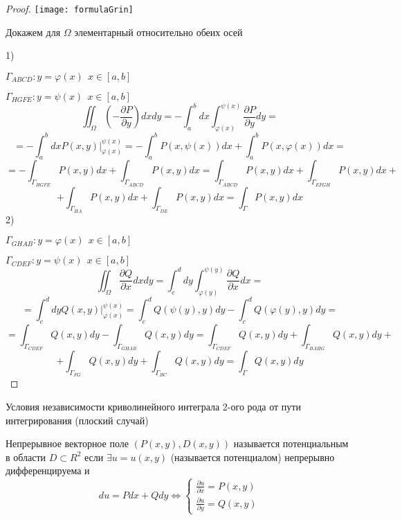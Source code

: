 \begin{proof}
  \texttt{[image: formulaGrin]}

  Докажем для $\Omega$ элементарный относительно обеих осей

  1)

  $\Gamma_{ABCD}: y = \varphi(x) ~~ x \in [a,b]$

  $\Gamma_{HGFE}: y = \psi(x) ~~ x \in [a,b]$
  $$
  \iint_{\Omega} \left( -\frac{\partial P}{\partial y} \right) dx dy =
  -\int_a^b dx \int_{\varphi(x)}^{\psi(x)} \frac{\partial P}{\partial y} dy =
  $$
  $$
  = -\int_a^b dx P(x,y) |_{\varphi(x)}^{\psi(x)} =
  - \int_a^b P(x, \psi(x))dx + \int_a^b P(x, \varphi(x)) dx =
  $$
  $$
  = -\int_{\Gamma_{HGFE}} P(x, y) dx + \int_{\Gamma_{ABCD}} P(x,y)dx =
  \int_{\Gamma_{ABCD}} P(x,y)dx + \int_{\Gamma_{EFGH}} P(x,y)dx +
  $$
  $$
  + \int_{\Gamma_{HA}} P(x, y)dx + \int_{\Gamma_{DE}} P(x,y) dx =
  \int_{\Gamma} P(x,y) dx
  $$
  2)

  $\Gamma_{GHAB}: y = \varphi(x) ~~ x \in [a,b]$

  $\Gamma_{CDEF}: y = \psi(x) ~~ x \in [a,b]$
  $$
  \iint_{\Omega} \frac{\partial Q}{\partial x} dx dy =
  \int_c^d dy \int_{\varphi(y)}^{\psi(y)} \frac{\partial Q}{\partial x} dx =
  $$
  $$
  = \int_c^d dy Q(x,y) |_{\varphi(x)}^{\psi(x)} =
  \int_c^d Q(\psi(y), y)dy - \int_c^d Q(\varphi(y), y) dy =
  $$
  $$
  = \int_{\Gamma_{CDEF}} Q(x, y) dy - \int_{\Gamma_{GHAB}} Q(x,y)dy =
  \int_{\Gamma_{CDEF}} Q(x, y) dy + \int_{\Gamma_{BAHG}} Q(x,y)dy +
  $$
  $$
  + \int_{\Gamma_{FG}} Q(x, y)dy + \int_{\Gamma_{BC}} Q(x,y) dy =
  \int_{\Gamma} Q(x,y) dy
  $$
\end{proof}

\begin{title}[\Large]
  Условия независимости криволинейного интеграла 2-ого рода от пути
  интегрирования (плоский случай)
\end{title}

\begin{define}
  Непрерывное векторное поле $(P(x,y), D(x,y))$ называется потенциальным в
  области $D \subset R^2$ если $\exists u = u(x,y)$ (называется потенциалом)
  непрерывно дифференцируема и
  $$
  du = Pdx + Qdy \Leftrightarrow
  \left\{
  \begin{array}{c}
    \frac{\partial u}{\partial x} = P(x, y) \\

    \frac{\partial u}{\partial y} = Q(x, y)
  \end{array}
  \right.
  $$
\end{define}

